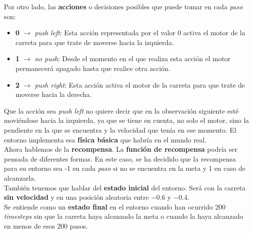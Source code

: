 \documentclass[11pt,fleqn]{book} %
\begin{document}
Por otro lado, las \textbf{acciones} o decisiones posibles que puede tomar en cada \textit{paso} son: \\

\begin{itemize}
	\item \textbf{0} $\rightarrow$ \textit{push left}: Esta acción representada por el valor 0 activa el motor de la carreta para que trate de moverse hacia la izquierda. \\
	
	\item \textbf{1} $\rightarrow$ \textit{no push}: Desde el momento en el que realiza esta acción el motor permanecerá apagado hasta que realice otra acción. \\
	
	\item \textbf{2} $\rightarrow$ \textit{push right}: Esta acción activa el motor de la carreta para que trate de moverse hacia la derecha. \\	
\end{itemize}

Que la acción sea \textit{push left} no quiere decir que en la observación siguiente esté moviéndose hacia la izquierda, ya que se tiene en cuenta, no solo el motor, sino la pendiente en la que se encuentra y la velocidad que tenía en ese momento. El entorno implementa esa \textbf{física básica} que habría en el mundo real. \\

Ahora hablemos de la \textbf{recompensa}. La \textbf{función de recompensa} podría ser pensada de diferentes formas. En este caso, se ha decidido que la recompensa para su entorno sea -1 en cada \textit{paso} si no se encuentra en la meta y 1 en caso de alcanzarla. \\

También tenemos que hablar del \textbf{estado inicial} del entorno. Será con la carreta \textbf{sin velocidad} y en una posición aleatoria entre $-0.6$ y $-0.4$.\\

Se entiende como un \textbf{estado final} en el entorno cuando han ocurrido 200 \textit{timesteps} sin que la carreta haya alcanzado la meta o cuando la haya alcanzado en menos de esos 200 pasos. \\

\end{document}
